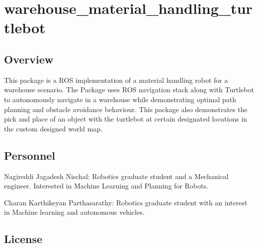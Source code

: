 \href{https://opensource.org/licenses/MIT}{\tt } \href{https://travis-ci.org/Charan-Karthikeyan/warehouse_material_handling_turtlebot}{\tt } \href{https://coveralls.io/github/Charan-Karthikeyan/warehouse_material_handling_turtlebot?branch=master}{\tt }

\section*{warehouse\+\_\+material\+\_\+handling\+\_\+turtlebot}

\subsection*{Overview}

This package is a R\+OS implementation of a material handling robot for a warehouse scenario. The Package uses R\+OS navigation stack along with Turtlebot to autonomously navigate in a warehouse while demonstrating optimal path planning and obstacle avoidance behaviour. This package also demonstrates the pick and place of an object with the turtlebot at certain designated locations in the custom designed world map.

\subsection*{Personnel}

Nagireddi Jagadesh Nischal\+: Robotics graduate student and a Mechanical engineer. Interested in Machine Learning and Planning for Robots.

Charan Karthikeyan Parthasarathy\+: Robotics graduate student with an interest in Machine learning and autonomous vehicles.

\subsection*{License}

